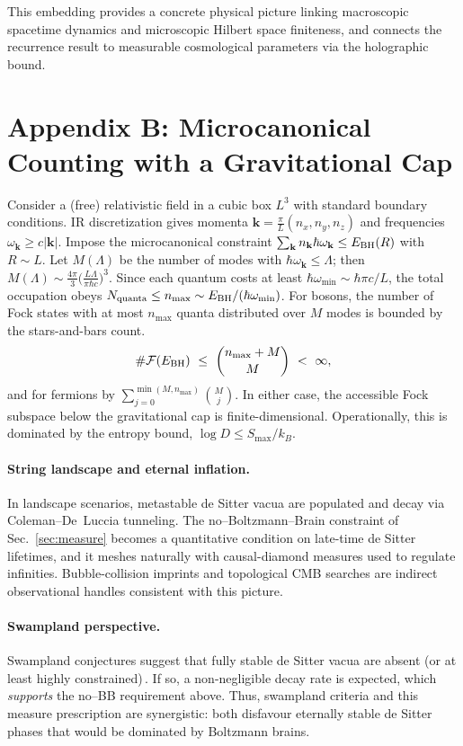 \documentclass[12pt]{article}
\newcommand{\Smax}{S_{\max}}
\theoremstyle{remark}
\begin{document}
This embedding provides a concrete physical picture linking macroscopic spacetime dynamics and microscopic Hilbert space finiteness, and connects the recurrence result to measurable cosmological parameters via the holographic bound.

\section*{Appendix B: Microcanonical Counting with a Gravitational Cap}
\label{app:microcanonical}

Consider a (free) relativistic field in a cubic box $L^3$ with standard boundary conditions. IR discretization gives momenta $\mathbf k=\frac{\pi}{L}(n_x,n_y,n_z)$ and frequencies $\omega_{\mathbf k}\ge c|\mathbf k|$. Impose the microcanonical constraint $\sum_{\mathbf k} n_{\mathbf k}\hbar\omega_{\mathbf k}\le E_{\rm BH}(R)$ with $R\sim L$.
Let $M(\Lambda)$ be the number of modes with $\hbar\omega_{\mathbf k}\le \Lambda$; then $M(\Lambda)\sim \frac{4\pi}{3}\big(\frac{L\Lambda}{\pi\hbar c}\big)^3$. Since each quantum costs at least $\hbar\omega_{\min}\sim \hbar\pi c/L$, the total occupation obeys $N_{\text{quanta}}\le n_{\max}\sim E_{\rm BH}/(\hbar\omega_{\min})$.
For bosons, the number of Fock states with at most $n_{\max}$ quanta distributed over $M$ modes is bounded by the stars-and-bars count.
\[
\#\mathcal{F}(E_{\rm BH})\ \le\ \binom{n_{\max}+M}{M}\ <\ \infty,
\]
and for fermions by $\sum_{j=0}^{\min(M,n_{\max})}\binom{M}{j}$. In either case, the accessible Fock subspace below the gravitational cap is finite-dimensional. Operationally, this is dominated by the entropy bound, $\log D\le \Smax/k_B$.

\paragraph{String landscape and eternal inflation.}
In landscape scenarios, metastable de Sitter vacua are populated and decay via Coleman–De~Luccia tunneling. The no--Boltzmann--Brain constraint of Sec.~\ref{sec:measure} becomes a quantitative condition on late-time de Sitter lifetimes, and it meshes naturally with causal-diamond measures used to regulate infinities. Bubble-collision imprints and topological CMB searches are indirect observational handles consistent with this picture.

\paragraph{Swampland perspective.}
Swampland conjectures suggest that fully stable de Sitter vacua are absent (or at least highly constrained)\,\cite{Obied2018,Ooguri2019}. If so, a non-negligible decay rate is expected, which \emph{supports} the no--BB requirement above. Thus, swampland criteria and this measure prescription are synergistic: both disfavour eternally stable de Sitter phases that would be dominated by Boltzmann brains.
\end{document}
